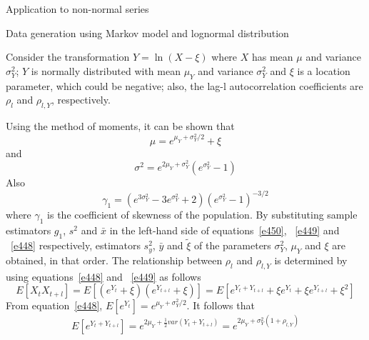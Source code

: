 \documentclass[8pt]{beamer}
\renewcommand{\emph}[1]{\textcolor{myorange}{#1}}
\begin{document}
\begin{frame}{Application to non-normal series}
    \begin{block}{Data generation using Markov model and lognormal distribution}
    \end{block}
    Consider the transformation $Y = \ln(X-\xi)$ where $X$ has \emph{mean} $\mu$ and \emph{variance} $\sigma_Y^2$; $Y$ is normally distributed with \emph{mean} $\mu_Y$ and \emph{variance} $\sigma_Y^2$ and $\xi$ is a location parameter, which could be negative; also, the lag-l autocorrelation coefficients are $\rho_l$ and $\rho_{l,Y}$, respectively. 

    Using the \emph{method of moments}, it can be shown that
\begin{equation}
    \mu = e^{\mu_Y + \sigma_Y^2 /2} + \xi
        \label{e448}
    \end{equation}
   and
\begin{equation}
    \sigma^2 = e^{2\mu_Y + \sigma_Y^2} \left( e^{\sigma_Y^2} -1 \right)
        \label{e449}
    \end{equation}
    Also
\begin{equation}
    \gamma_1 = \left(e^{3\sigma_Y^2} - 3e^{\sigma_Y^2} + 2\right) \left(e^{\sigma_Y^2}-1 \right)^{-3/2}
        \label{e450}
    \end{equation}
    where $\gamma_1$ is the coefficient of skewness of the population. By substituting sample estimators $g_1$, $s^2$ and $\bar{x}$ in the left-hand side of equations~\ref{e450}, ~\ref{e449} and ~\ref{e448} respectively, estimators $s_y^2$, $\bar{y}$ and $\tilde{\xi}$ of the parameters $\sigma_Y^2$, $\mu_Y$ and $\xi$ are obtained, in that order. The relationship between $\rho_l$ and $\rho_{l,Y}$ is determined by using equations~\ref{e448} and ~\ref{e449} as follows
\begin{equation}
E[X_t X_{t+l}] = E\left[ \left( e^{Y_t} + \xi \right)\left(e^{Y_{t+l}} + \xi \right) \right]= E\left[  e^{Y_t + Y_{t+l}} + \xi e^{Y_t} + \xi e^{Y_{t+l}} + \xi^2 \right]
        \label{e450a}
    \end{equation}
    From equation~\ref{e448}, $E[e^{Y_t}] = e^{\mu_Y + \sigma_Y^2 / 2}$. It follows that 
    \[
        E\left[e^{Y_t + Y_{t+l}}\right] = e^{2\mu_Y + \frac{1}{2} var\left( Y_t + Y_{t+l}\right)} = e^{2\mu_Y + \sigma_Y^2 \left(1+\rho_{l,Y}\right)}
    \]

\end{frame}
\end{document}
